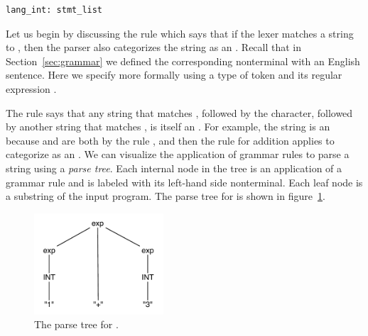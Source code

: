 \documentclass[7x10]{TimesAPriori_MIT}%
\numberwithin{theorem}{chapter}
\numberwithin{definition}{chapter}
\numberwithin{equation}{chapter}
\begin{document}
{\begin{center}
\begin{minipage}{0.95\textwidth}
\begin{lstlisting}[escapechar=$]
lang_int: stmt_list
\end{lstlisting}
\end{minipage}
\end{center}

Let us begin by discussing the rule  which says that if
the lexer matches a string to , then the parser also
categorizes the string as an .  Recall that in
Section~\ref{sec:grammar} we defined the corresponding \Int{}
nonterminal with an English sentence. Here we specify  more
formally using a type of token  and its regular expression
.

The rule  says that any string that matches
, followed by the \code{+} character, followed by another
string that matches , is itself an .  For example,
the string  is an  because  and
 are both  by the rule , and then
the rule for addition applies to categorize  as an
. We can visualize the application of grammar rules to parse
a string using a \emph{parse tree}. Each
internal node in the tree is an application of a grammar rule and is
labeled with its left-hand side nonterminal. Each leaf node is a
substring of the input program.  The parse tree for  is
shown in figure~\ref{fig:simple-parse-tree}.

\begin{figure}[tbp]
\begin{tcolorbox}[colback=white]
\centering
\includegraphics[width=1.9in]{figs/simple-parse-tree}
\end{tcolorbox}
\caption{The parse tree for .}
\label{fig:simple-parse-tree}
\end{figure}

}
\end{document}
